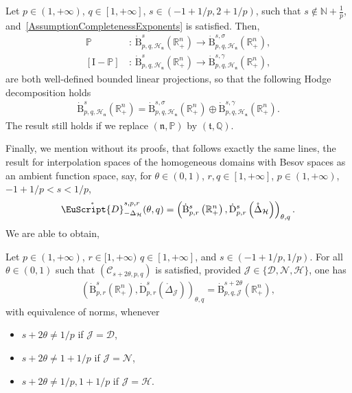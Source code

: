 \documentclass[10pt]{amsart}
\theoremstyle{definition}\newtheorem{defi}[theo]{Definition}\newtheorem{rema}[theo]{Remark}\newtheorem{exam}[theo]{Example}\newtheorem{exem}[theo]{Example}\newtheorem{nota}[theo]{Notation}
\newcommand{\bbP}{\mathbb{P}}
\newcommand{\bbR}{\mathbb{R}}
\newcommand{\bbN}{\mathbb{N}}
\newcommand{\bbQ}{\mathbb{Q}}
\newcommand{\rmB}{\mathrm{B}}
\newcommand{\rmD}{\mathrm{D}}
\newcommand{\rmI}{\mathrm{I}}
\newcommand{\clH}{\mathcal{H}}
\newcommand{\clC}{\mathcal{C}}
\newcommand{\clN}{\mathcal{N}}
\newcommand{\clJ}{\mathcal{J}}
\newcommand{\clD}{\mathcal{D}}
\newcommand{\fkn}{\mathfrak{n}}
\newcommand{\fkt}{\mathfrak{t}}
\newcommand{\rgeusD}{\mathring{\eus{D}}}
\newcommand{\eus}{\EuScript}
\begin{document}
\begin{coro}\label{cor:extendedHodgeDecompComptabilityConditions}
Let $p\in(1,+\infty)$, $q\in[1,+\infty]$, $s\in(-1+1/p,2+1/p)$, such that $s\notin \bbN +\frac{1}{p}$, and~\eqref{AssumptionCompletenessExponents} is satisfied. Then,
\begin{align*}
\bbP&\,:\,\dot{\rmB}^{s}_{p,q,\clH_{\fkn}}\left(\bbR^n_+\right) \longrightarrow \dot{\rmB}^{s,\sigma}_{p,q,\clH_{\fkn}}\left(\bbR^n_+\right),\\
[\rmI -\bbP]&\,:\,\dot{\rmB}^{s}_{p,q,\clH_{\fkn}}\left(\bbR^n_+\right) \longrightarrow \dot{\rmB}^{s,\gamma}_{p,q,\clH_{\fkn}}\left(\bbR^n_+\right),
\end{align*}
are both well-defined bounded linear projections, so that the following Hodge decomposition holds
\begin{align*}
\dot{\rmB}^{s}_{p,q,\clH_{\fkn}}\left(\bbR^n_+\right) = \dot{\rmB}^{s,\sigma}_{p,q,\clH_{\fkn}}\left(\bbR^n_+\right) \oplus \dot{\rmB}^{s,\gamma}_{p,q,\clH_{\fkn}}\left(\bbR^n_+\right) .
\end{align*}
The result still holds if we replace $(\fkn,\bbP)$ by $(\fkt,\bbQ)$.
\end{coro}



Finally, we mention without its proofs, that follows exactly the same lines, the result for interpolation spaces of the homogeneous domains with Besov spaces as an ambient function space, say, for $\theta\in(0,1)$, $r,q\in[1,+\infty]$, $p\in(1,+\infty)$, $-1+1/p<s<1/p$,
\begin{align*}
\rgeusD^{s,p,r}_{-\Delta_{\clH}}(\theta,q) = \left(\dot{\rmB}^{s}_{p,r}\left(\bbR^n_+\right),\dot{\rmD}^{s}_{p,r}\left(\mathring{\Delta}_{\clH}\right)\right)_{\theta,q} .
\end{align*}
We are able to obtain,

\begin{prop}\label{prop:InterpHomDomainBesovLaplacians}
Let $p\in(1,+\infty)$, $r\in[1,+\infty)$ $q\in[1,+\infty]$, and $s\in(-1+1/p,1/p)$. For all $\theta\in(0,1)$ such that $(\clC_{s+2\theta,p,q})$ is satisfied, provided $\clJ\in\{\clD,\clN,\clH\}$, one has
\begin{align*}
\left(\dot{\rmB}^{s}_{p,r}\left(\bbR^n_+\right),\dot{\rmD}^{s}_{p,r}\left(\mathring{\Delta}_\clJ\right)\right)_{\theta,q} = \dot{\rmB}^{s+2\theta}_{p,q,\clJ}\left(\bbR^n_+\right),
\end{align*}
with equivalence of norms, whenever
\begin{itemize}
\item $s+2\theta\neq 1/p$ if $\clJ=\clD$,
\item $s+2\theta\neq 1+1/p$ if $\clJ=\clN$,
\item $s+2\theta\neq 1/p,1+1/p$ if $\clJ=\clH$.
\end{itemize}
\end{prop}
\end{document}
